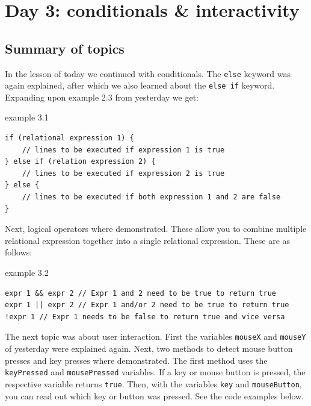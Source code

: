 \chapter{Day 3: conditionals \& interactivity}

\section{Summary of topics}

In the lesson of today we continued with conditionals. The \texttt{else} keyword was again explained, after which we also learned about the \texttt{else if} keyword. Expanding upon example 2.3 from yesterday we get:

\begin{codebox}{example 3.1}
    \begin{lstlisting}
if (relational expression 1) {
    // lines to be executed if expression 1 is true
} else if (relation expression 2) {
    // lines to be executed if expression 2 is true
} else {
    // lines to be executed if both expression 1 and 2 are false
}
    \end{lstlisting}
\end{codebox}

Next, logical operators where demonstrated. These allow you to combine multiple relational expression together into a single relational expression. These are as follows:

\begin{codebox}{example 3.2}
    \begin{lstlisting}
expr 1 && expr 2 // Expr 1 and 2 need to be true to return true
expr 1 || expr 2 // Expr 1 and/or 2 need to be true to return true
!expr 1 // Expr 1 needs to be false to return true and vice versa
    \end{lstlisting}
\end{codebox}

The next topic was about user interaction. First the variables \texttt{mouseX} and \texttt{mouseY} of yesterday were explained again. Next, two methods to detect mouse button presses and key presses where demonstrated. The first method uses the \texttt{keyPressed} and \texttt{mousePressed} variables. If a key or mouse button is pressed, the respective variable returns \texttt{true}. Then, with the variables \texttt{key} and \texttt{mouseButton}, you can read out which key or button was pressed. See the code examples below.

